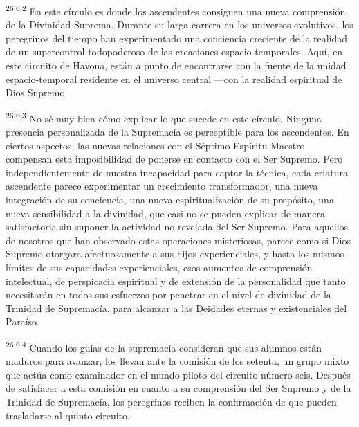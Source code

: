 \par
\textsuperscript{26:6.2} En este círculo es donde los ascendentes consiguen una nueva comprensión de la Divinidad Suprema. Durante su larga carrera en los universos evolutivos, los peregrinos del tiempo han experimentado una conciencia creciente de la realidad de un supercontrol todopoderoso de las creaciones espacio-temporales. Aquí, en este circuito de Havona, están a punto de encontrarse con la fuente de la unidad espacio-temporal residente en el universo central ---con la realidad espiritual de Dios Supremo.

\par
\textsuperscript{26:6.3} No sé muy bien cómo explicar lo que sucede en este círculo. Ninguna presencia personalizada de la Supremacía es perceptible para los ascendentes. En ciertos aspectos, las nuevas relaciones con el Séptimo Espíritu Maestro compensan esta imposibilidad de ponerse en contacto con el Ser Supremo. Pero independientemente de nuestra incapacidad para captar la técnica, cada criatura ascendente parece experimentar un crecimiento transformador, una nueva integración de su conciencia, una nueva espiritualización de su propósito, una nueva sensibilidad a la divinidad, que casi no se pueden explicar de manera satisfactoria sin suponer la actividad no revelada del Ser Supremo. Para aquellos de nosotros que han observado estas operaciones misteriosas, parece como si Dios Supremo otorgara afectuosamente a sus hijos experienciales, y hasta los mismos límites de sus capacidades experienciales, esos aumentos de comprensión intelectual, de perspicacia espiritual y de extensión de la personalidad que tanto necesitarán en todos sus esfuerzos por penetrar en el nivel de divinidad de la Trinidad de Supremacía, para alcanzar a las Deidades eternas y existenciales del Paraíso.

\par
\textsuperscript{26:6.4} Cuando los guías de la supremacía consideran que sus alumnos están maduros para avanzar, los llevan ante la comisión de los setenta, un grupo mixto que actúa como examinador en el mundo piloto del circuito número seis. Después de satisfacer a esta comisión en cuanto a su comprensión del Ser Supremo y de la Trinidad de Supremacía, los peregrinos reciben la confirmación de que pueden trasladarse al quinto circuito.

